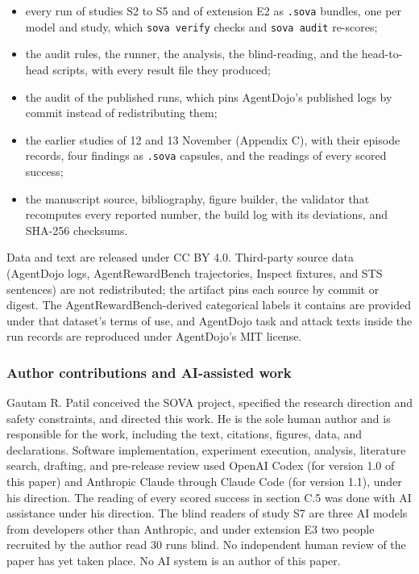 \documentclass[
  american,
  10pt,
  a4paper,
]{article}
\providecommand{\tightlist}{%
  \setlength{\itemsep}{0pt}\setlength{\parskip}{0pt}}
\begin{document}
\begin{itemize}
\tightlist
\item
  every run of studies S2 to S5 and of extension E2 as \texttt{.sova}
  bundles, one per model and study, which \texttt{sova\ verify} checks
  and \texttt{sova\ audit} re-scores;
\item
  the audit rules, the runner, the analysis, the blind-reading, and the
  head-to-head scripts, with every result file they produced;
\item
  the audit of the published runs, which pins AgentDojo's published logs
  by commit instead of redistributing them;
\item
  the earlier studies of 12 and 13 November (Appendix C), with their
  episode records, four findings as \texttt{.sova} capsules, and the
  readings of every scored success;
\item
  the manuscript source, bibliography, figure builder, the validator
  that recomputes every reported number, the build log with its
  deviations, and SHA-256 checksums.
\end{itemize}

Data and text are released under CC BY 4.0. Third-party source data
(AgentDojo logs, AgentRewardBench trajectories, Inspect fixtures, and
STS sentences) are not redistributed; the artifact pins each source by
commit or digest. The AgentRewardBench-derived categorical labels it
contains are provided under that dataset's terms of use, and AgentDojo
task and attack texts inside the run records are reproduced under
AgentDojo's MIT license.

\subsubsection{Author contributions and AI-assisted
work}\label{author-contributions-and-ai-assisted-work}

Gautam R. Patil conceived the SOVA project, specified the research
direction and safety constraints, and directed this work. He is the sole
human author and is responsible for the work, including the text,
citations, figures, data, and declarations. Software implementation,
experiment execution, analysis, literature search, drafting, and
pre-release review used OpenAI Codex (for version 1.0 of this paper) and
Anthropic Claude through Claude Code (for version 1.1), under his
direction. The reading of every scored success in section C.5 was done
with AI assistance under his direction. The blind readers of study S7
are three AI models from developers other than Anthropic, and under
extension E3 two people recruited by the author read 30 runs blind. No
independent human review of the paper has yet taken place. No AI system
is an author of this paper.
\end{document}
